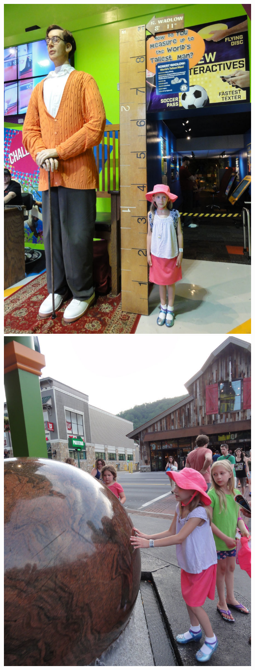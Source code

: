 
\begin{center}
\includegraphics{images/OdditoriumTallMan} \includegraphics{images/OdditoriumSphereWithYouth}

\end{center}

